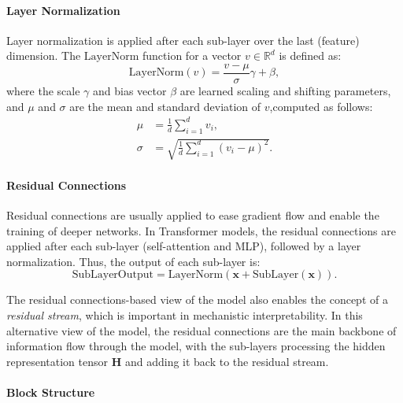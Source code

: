 \paragraph{Layer Normalization}

Layer normalization \parencite{ba_layer_2016} is applied after each sub-layer over the last (feature) dimension. The $\text{LayerNorm}$ function for a vector $v \in \mathbb{R}^d$ is defined as:
\begin{equation*}
    \text{LayerNorm}(v) = \frac{v - \mu}{\sigma}\gamma + \beta,
\end{equation*}
where the scale $\gamma$ and bias vector $\beta$ are learned scaling and shifting parameters, and $\mu$ and $\sigma$ are the mean and standard deviation of $v$,computed as follows:
\begin{align*}
    \mu    & = \frac{1}{d} \sum_{i=1}^{d} v_i,                  \\
    \sigma & = \sqrt{\frac{1}{d} \sum_{i=1}^{d} (v_i - \mu)^2}.
\end{align*}

\paragraph{Residual Connections}

Residual connections \parencite{he_deep_2016} are usually applied to ease gradient flow and enable the training of deeper networks. In Transformer models, the residual connections are applied after each sub-layer (self-attention and MLP), followed by a layer normalization. Thus, the output of each sub-layer is:
\begin{equation*}
    \text{SubLayerOutput} = \text{LayerNorm}(\mathbf{x} + \text{SubLayer}(\mathbf{x})).
\end{equation*}

The residual connections-based view of the model also enables the concept of a \emph{residual stream}, which is important in mechanistic interpretability. In this alternative view of the model, the residual connections are the main backbone of information flow through the model, with the sub-layers processing the hidden representation tensor $\mathbf{H}$ and adding it back to the residual stream.

\paragraph{Block Structure}


